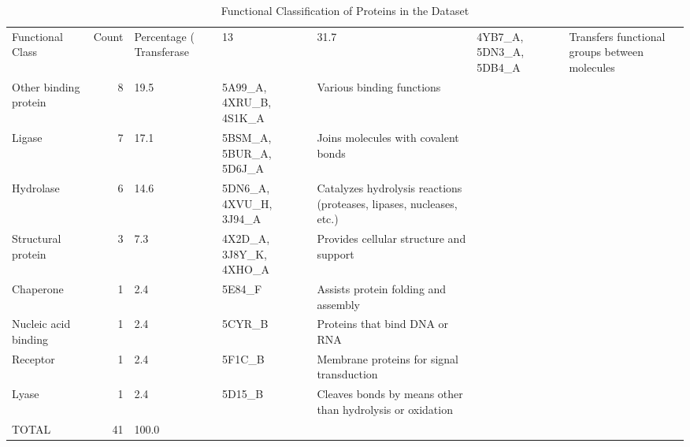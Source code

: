\begin{table}
\caption{Functional Classification of Proteins in the Dataset}
\label{tab:functional-classification}
\begin{tabular}{lrlll}
\toprule
Functional Class & Count & Percentage (%
\midrule
Transferase & 13 & 31.7 & 4YB7_A, 5DN3_A, 5DB4_A & Transfers functional groups between molecules \\
Other binding protein & 8 & 19.5 & 5A99_A, 4XRU_B, 4S1K_A & Various binding functions \\
Ligase & 7 & 17.1 & 5BSM_A, 5BUR_A, 5D6J_A & Joins molecules with covalent bonds \\
Hydrolase & 6 & 14.6 & 5DN6_A, 4XVU_H, 3J94_A & Catalyzes hydrolysis reactions (proteases, lipases, nucleases, etc.) \\
Structural protein & 3 & 7.3 & 4X2D_A, 3J8Y_K, 4XHO_A & Provides cellular structure and support \\
Chaperone & 1 & 2.4 & 5E84_F & Assists protein folding and assembly \\
Nucleic acid binding & 1 & 2.4 & 5CYR_B & Proteins that bind DNA or RNA \\
Receptor & 1 & 2.4 & 5F1C_B & Membrane proteins for signal transduction \\
Lyase & 1 & 2.4 & 5D15_B & Cleaves bonds by means other than hydrolysis or oxidation \\
TOTAL & 41 & 100.0 &  &  \\
\bottomrule
\end{tabular}
\end{table}
